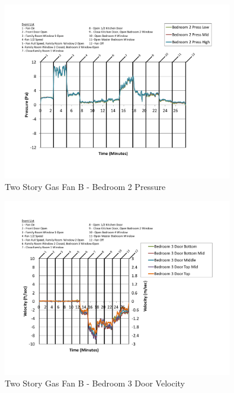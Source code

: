 \documentclass{article}
\begin{document}
\begin{appendices}
	\begin{figure}[H]
		\centering
		\includegraphics[height=3.05in,trim=0.67in 1.1in 0.67in 0.8in,clip=true]{0_Images/Results_Charts/ColdFlow/Two_Story/Gas/B/Bedroom_2_Pressure.pdf}
		\caption{Two Story Gas Fan B - Bedroom 2 Pressure}
	\end{figure}
 

	\begin{figure}[H]
		\centering
		\includegraphics[height=3.05in,trim=0.67in 1.1in 0.67in 0.8in,clip=true]{0_Images/Results_Charts/ColdFlow/Two_Story/Gas/B/Bedroom_3_Door_Velocity.pdf}
		\caption{Two Story Gas Fan B - Bedroom 3 Door Velocity}
	\end{figure}
 
	\clearpage


\end{appendices}
\end{document}
